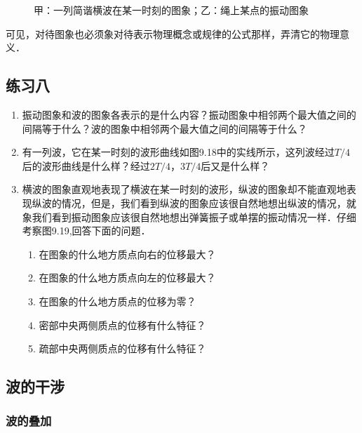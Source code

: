 \begin{figure}[H]
    \caption{甲：一列简谐横波在某一时刻的图象；乙：绳上某点的振动图象}
\end{figure}
可见，对待图象也必须象对待表示物理概念或规律的公式那样，弄清它的物理意义．

\subsection*{练习八}
\begin{enumerate}
    \item 振动图象和波的图象各表示的是什么内容？振动图象中相邻两个最大值之间的间隔等于什么？波的图象中相邻两个最大值之间的间隔等于什么？
    \item 有一列波，它在某一时刻的波形曲线如图9.18中的实线所示，这列波经过$T/4$后的波形曲线是什么样？经过$2T/4$，$3T/4$后又是什么样？
    \item 横波的图象直观地表现了横波在某一时刻的波形，纵波的图象却不能直观地表现纵波的情况，但是，我们看到纵波的图象应该很自然地想出纵波的情况，就象我们看到振动图象应该很自然地想出弹簧振子或单摆的振动情况一样．仔细考察图9.19,回答下面的问题．
          \begin{enumerate}
              \item 在图象的什么地方质点向右的位移最大？
              \item 在图象的什么地方质点向左的位移最大？
              \item 在图象的什么地方质点的位移为零？
              \item 密部中央两侧质点的位移有什么特征？
              \item 疏部中央两侧质点的位移有什么特征？
          \end{enumerate}
\end{enumerate}

\subsection{波的干涉}
\subsubsection{波的叠加}

